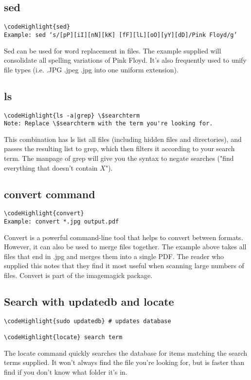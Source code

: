 \documentclass[12pt,a4paper]{article}
\begin{document}
\subsection{sed}  
\begin{Verbatim}[commandchars=\\\{\}]
\codeHighlight{sed}
Example: sed ‘s/[pP][iI][nN][kK] [fF][lL][oO][yY][dD]/Pink Floyd/g’
\end{Verbatim}
Sed can be used for word replacement in files. The example supplied will consolidate all spelling variations of Pink Floyd. It's also frequently used to unify file types (i.e. .JPG .jpeg .jpg into one uniform extension).

\subsection{ls}
\begin{Verbatim}[commandchars=\\\{\}]
\codeHighlight{ls -a|grep} \$searchterm
Note: Replace \$searchterm with the term you're looking for.
\end{Verbatim}
This combination has ls list all files (including hidden files and directories), and passes the resulting list to grep, which then filters it according to your search term.  The manpage of grep will give you the syntax to negate searches ("find everything that doesn't contain $X$").

\subsection{convert command}
\begin{Verbatim}[commandchars=\\\{\}]
\codeHighlight{convert}
Example: convert *.jpg output.pdf
\end{Verbatim}
Convert is a powerful command-line tool that helps to convert between formats. However, it can also be used to merge files together. The example above takes all files that end in .jpg and merges them into a single PDF. The reader who supplied this notes that they find it most useful when scanning large numbers of files. Convert is part of the imagemagick package.

\subsection{Search with updatedb and locate}
\label{locate}
\begin{Verbatim}[commandchars=\\\{\}]
\codeHighlight{sudo updatedb} # updates database

\codeHighlight{locate} search term
\end{Verbatim}
The locate command quickly searches the database for items matching the search terms supplied. It won't always find the file you're looking for, but is faster than find if you don't know what folder it's in.
\end{document}
